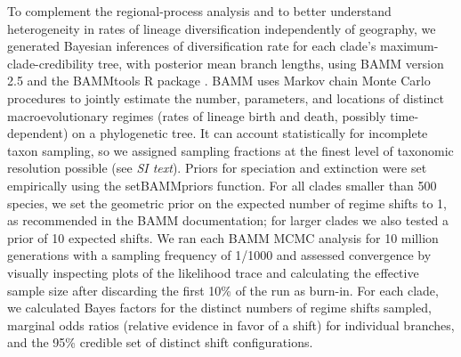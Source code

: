 \documentclass[9pt,twocolumn,twoside,lineno]{pnas-new}
\begin{document}
{To complement the regional-process analysis and to better understand
heterogeneity in rates of lineage diversification independently of
geography, we generated Bayesian inferences of diversification rate
for each clade's maximum-clade-credibility tree, with posterior mean
branch lengths, using BAMM version 2.5 and the BAMMtools R package
\citep{Rabosky2014}. BAMM uses Markov chain Monte Carlo procedures to
jointly estimate the number, parameters, and locations of distinct
macroevolutionary regimes (rates of lineage birth and death, possibly
time-dependent) on a phylogenetic tree. It can account statistically
for incomplete taxon sampling, so we assigned sampling fractions at
the finest level of taxonomic resolution possible (see \textit{SI
  text}). Priors for speciation and extinction were set empirically
using the \textrm{setBAMMpriors} function. For all clades smaller than
500 species, we set the geometric prior on the expected number of
regime shifts to 1, as recommended in the BAMM documentation; for
larger clades we also tested a prior of 10 expected shifts. We ran
each BAMM MCMC analysis for 10 million generations with a sampling
frequency of 1/1000 and assessed convergence by visually inspecting
plots of the likelihood trace and calculating the effective sample
size after discarding the first 10\% of the run as burn-in. For each
clade, we calculated Bayes factors for the distinct numbers of regime
shifts sampled, marginal odds ratios (relative evidence in favor of a
shift) for individual branches, and the 95\% credible set of distinct
shift configurations.
}
\showmatmethods


\showacknow %




%
%
\end{document}
